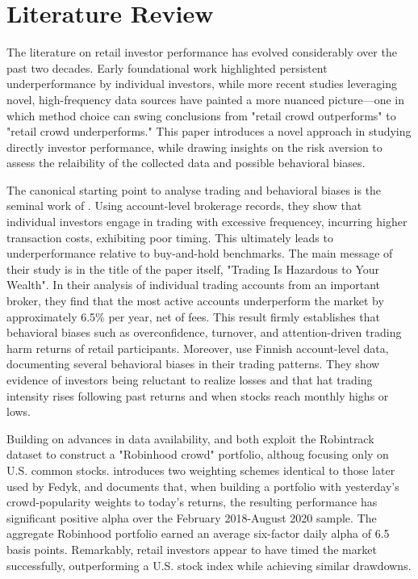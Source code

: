 \section{Literature Review}

The literature on retail investor performance has evolved considerably over the past two decades. 
Early foundational work highlighted persistent underperformance by individual investors, while more recent studies leveraging novel, high-frequency data sources have painted a more nuanced picture—one in which method choice can swing conclusions from "retail crowd outperforms" to "retail crowd underperforms."
This paper introduces a novel approach in studying directly investor performance, while drawing insights on the risk aversion to assess the relaibility of the collected data and possible behavioral biases.

The canonical starting point to analyse trading and behavioral biases is the seminal work of \cite{BarberOdean2000}. 
Using account-level brokerage records, they show that individual investors engage in trading with excessive frequencey, incurring higher transaction costs, 
exhibiting poor timing. This ultimately leads to underperformance relative to buy-and-hold benchmarks.
The main message of their study is in the title of the paper itself, "Trading Is Hazardous to Your Wealth".  
In their analysis of individual trading accounts from an important broker, they find that the most active accounts underperform the market by approximately 6.5\% per year, net of fees. 
This result firmly establishes that behavioral biases such as overconfidence, turnover, and attention-driven trading harm returns of retail participants.
Moreover, \cite{Grinblatt2001} use Finnish account-level data, documenting several behavioral biases in  their trading patterns.
They show evidence of investors being reluctant to realize losses and that hat trading intensity rises following past returns and when stocks reach monthly highs or lows.

Building on advances in data availability, \cite{Welch2022} and \cite{Fedyk2024} both exploit the Robintrack dataset to construct a "Robinhood crowd" portfolio, 
althoug focusing only on U.S. common stocks.
\cite{Welch2022} introduces two weighting schemes identical to those later used by Fedyk, and documents that, when building a portfolio with yesterday's crowd-popularity weights to today's returns, the resulting performance has significant positive alpha over the February 2018-August 2020 sample. 
The aggregate Robinhood portfolio earned an average six-factor daily alpha of 6.5 basis points.
Remarkably, retail investors appear to have timed the market successfully, outperforming a U.S. stock index while achieving similar drawdowns.


